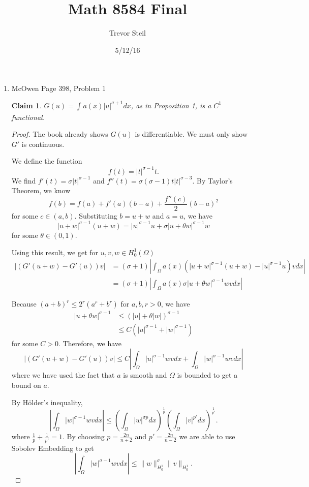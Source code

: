 \documentclass[a4paper]{article}
\title{Math 8584 Final }
\date{5/12/16}
\author{Trevor Steil}
\newtheorem*{claim}{Claim}
\begin{document}
\maketitle

\begin{enumerate}
  \item McOwen Page 398, Problem 1
    \begin{claim} $G(u) = \int_{}^{} a(x) |u|^{\sigma + 1} dx$, as in Proposition 1, is a $C^1$ functional.
    \end{claim}

    \begin{proof}
      The book already shows $G(u)$ is differentiable. We must only show $G'$ is continuous.

      We define the function
      \[ f(t) = |t|^{\sigma-1}t .\]
      We find $f'(t) = \sigma |t|^{\sigma-1}$ and $f''(t) = \sigma (\sigma -1) t |t|^{\sigma-3}$. By Taylor's Theorem, we know
      \[ f(b) = f(a) + f'(a)(b-a) + \frac{f''(c)}{2} (b-a)^2 \]
      for some $c \in (a,b)$. Substituting $b = u+w$ and $a = u$, we have
      \[ |u+w|^{\sigma-1} (u+w) = |u|^{\sigma-1} u + \sigma |u+\theta w|^{\sigma-1}w \]
    for some $\theta \in (0,1)$.

    Using this result, we get for $u,v,w \in H^1_0(\Omega)$
    \begin{align*}
      |(G'(u+w) - G'(u))v| &= (\sigma+1) \left| \int_{\Omega}^{} a(x) \left( |u+w|^{\sigma-1}(u+w) - |u|^{\sigma-1}u \right) v dx \right| \\
      &= (\sigma + 1) \left| \int_{\Omega}^{} a(x) \sigma |u + \theta w|^{\sigma-1} w v dx \right|
    \end{align*}

    Because $(a+b)^r \leq 2^r(a^r + b^r)$ for $a,b,r>0$, we have
    \begin{align*}
      |u+\theta w|^{\sigma-1} &\leq ( |u| + \theta |w| )^{\sigma-1} \\
      &\leq C ( |u|^{\sigma-1} + |w|^{\sigma-1} )
    \end{align*}
    for some $C>0$. Therefore, we have
    \begin{equation*}
      |(G'(u+w) - G'(u))v| \leq C \left| \int_{\Omega}^{} |u|^{\sigma-1} w v dx + \int_{\Omega}^{} |w|^{\sigma-1}w v dx \right|
    \end{equation*}
    where we have used the fact that $a$ is smooth and $\Omega$ is bounded to get a bound on $a$.

    By H\"{o}lder's inequality,
    \[ \left|\int_{\Omega}^{} |w|^{\sigma-1} w v dx \right| \leq \left( \int_{\Omega}^{} |w|^{\sigma p} dx \right)^{\frac{1}{p}} \left( \int_{\Omega}^{} |v|^{p'} dx
    \right)^{\frac{1}{p'}} .\]
    where $\frac{1}{p} + \frac{1}{p'} = 1$. By choosing $p=\frac{2n}{n+2}$ and $p'=\frac{2n}{n-2}$ we are able to use Sobolev Embedding to get
    \[ \left| \int_{\Omega}^{} |w|^{\sigma-1} w v dx \right| \leq \|w\|_{H^1_0}^\sigma \|v\|_{H^1_0} .\]


\end{proof}
\end{enumerate}
\end{document}
